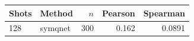 \begin{tabular}{llrrr}
\toprule
Shots & Method & $n$ & Pearson & Spearman \\
\midrule
128 & symqnet & 300 & 0.162 & 0.0891 \\
\bottomrule
\end{tabular}
